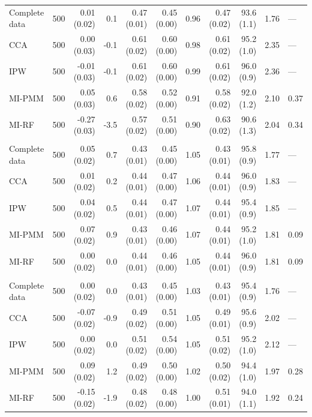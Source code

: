 \documentclass[11pt,a4paper]{article}
\begin{document}
\begin{landscape}
\begin{longtable}{l|rrrrrrrrrl}
\midrule\addlinespace[2.5pt]
\multicolumn{11}{l}{Wasting — MCAR 50\%} \\[2.5pt] 
\midrule\addlinespace[2.5pt]
Complete data & 500 & 0.01 (0.02) & 0.1 & 0.47 (0.01) & 0.45 (0.00) & 0.96 & 0.47 (0.02) & 93.6 (1.1) & 1.76 & — \\ 
CCA & 500 & 0.00 (0.03) & -0.1 & 0.61 (0.02) & 0.60 (0.00) & 0.98 & 0.61 (0.02) & 95.2 (1.0) & 2.35 & — \\ 
IPW & 500 & -0.01 (0.03) & -0.1 & 0.61 (0.02) & 0.60 (0.00) & 0.99 & 0.61 (0.02) & 96.0 (0.9) & 2.36 & — \\ 
MI-PMM & 500 & 0.05 (0.03) & 0.6 & 0.58 (0.02) & 0.52 (0.00) & 0.91 & 0.58 (0.02) & 92.0 (1.2) & 2.10 & 0.37 \\ 
MI-RF & 500 & -0.27 (0.03) & -3.5 & 0.57 (0.02) & 0.51 (0.00) & 0.90 & 0.63 (0.02) & 90.6 (1.3) & 2.04 & 0.34 \\ 
\midrule\addlinespace[2.5pt]
\multicolumn{11}{l}{Wasting — MAR 10\%} \\[2.5pt] 
\midrule\addlinespace[2.5pt]
Complete data & 500 & 0.05 (0.02) & 0.7 & 0.43 (0.01) & 0.45 (0.00) & 1.05 & 0.43 (0.01) & 95.8 (0.9) & 1.77 & — \\ 
CCA & 500 & 0.01 (0.02) & 0.2 & 0.44 (0.01) & 0.47 (0.00) & 1.06 & 0.44 (0.01) & 96.0 (0.9) & 1.83 & — \\ 
IPW & 500 & 0.04 (0.02) & 0.5 & 0.44 (0.01) & 0.47 (0.00) & 1.07 & 0.44 (0.01) & 95.4 (0.9) & 1.85 & — \\ 
MI-PMM & 500 & 0.07 (0.02) & 0.9 & 0.43 (0.01) & 0.46 (0.00) & 1.07 & 0.44 (0.01) & 95.2 (1.0) & 1.81 & 0.09 \\ 
MI-RF & 500 & 0.00 (0.02) & 0.0 & 0.44 (0.01) & 0.46 (0.00) & 1.05 & 0.44 (0.01) & 96.0 (0.9) & 1.81 & 0.09 \\ 
\midrule\addlinespace[2.5pt]
\multicolumn{11}{l}{Wasting — MAR 30\%} \\[2.5pt] 
\midrule\addlinespace[2.5pt]
Complete data & 500 & 0.00 (0.02) & 0.0 & 0.43 (0.01) & 0.45 (0.00) & 1.03 & 0.43 (0.01) & 95.4 (0.9) & 1.76 & — \\ 
CCA & 500 & -0.07 (0.02) & -0.9 & 0.49 (0.02) & 0.51 (0.00) & 1.05 & 0.49 (0.01) & 95.6 (0.9) & 2.02 & — \\ 
IPW & 500 & 0.00 (0.02) & 0.0 & 0.51 (0.02) & 0.54 (0.00) & 1.05 & 0.51 (0.02) & 95.2 (1.0) & 2.12 & — \\ 
MI-PMM & 500 & 0.09 (0.02) & 1.2 & 0.49 (0.02) & 0.50 (0.00) & 1.02 & 0.50 (0.02) & 94.4 (1.0) & 1.97 & 0.28 \\ 
MI-RF & 500 & -0.15 (0.02) & -1.9 & 0.48 (0.02) & 0.48 (0.00) & 1.00 & 0.51 (0.01) & 94.0 (1.1) & 1.92 & 0.24 \\ 

\end{longtable}
\end{landscape}
\end{document}
